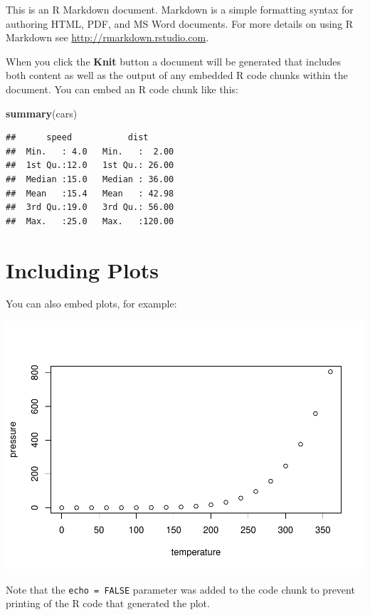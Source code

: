 \documentclass[letterpaper,10pt, openright]{report}
\newenvironment{Shaded}{\begin{snugshade}}{\end{snugshade}}
\newcommand{\KeywordTok}[1]{\textcolor[rgb]{0.13,0.29,0.53}{\textbf{#1}}}
\newcommand{\NormalTok}[1]{#1}
\begin{document}
This is an R Markdown document. Markdown is a simple formatting syntax
for authoring HTML, PDF, and MS Word documents. For more details on
using R Markdown see \url{http://rmarkdown.rstudio.com}.

When you click the \textbf{Knit} button a document will be generated
that includes both content as well as the output of any embedded R code
chunks within the document. You can embed an R code chunk like this:

\begin{Shaded}
\begin{Highlighting}[]
\KeywordTok{summary}\NormalTok{(cars)}
\end{Highlighting}
\end{Shaded}

\begin{verbatim}
##      speed           dist       
##  Min.   : 4.0   Min.   :  2.00  
##  1st Qu.:12.0   1st Qu.: 26.00  
##  Median :15.0   Median : 36.00  
##  Mean   :15.4   Mean   : 42.98  
##  3rd Qu.:19.0   3rd Qu.: 56.00  
##  Max.   :25.0   Max.   :120.00
\end{verbatim}

\hypertarget{including-plots}{%
\section{Including Plots}\label{including-plots}}

You can also embed plots, for example:

\includegraphics{rmarkdown-demo_files/figure-latex/pressure-1.pdf}

Note that the \texttt{echo\ =\ FALSE} parameter was added to the code
chunk to prevent printing of the R code that generated the plot.
\end{document}
